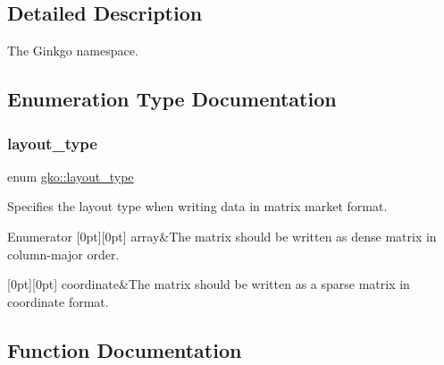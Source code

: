 \subsection{Detailed Description}
The Ginkgo namespace. 

\subsection{Enumeration Type Documentation}
\mbox{\label{namespacegko_ae749a5ea11a93c1bcc9158d9a6e9fb68}} 
\subsubsection{\texorpdfstring{layout\+\_\+type}{layout\_type}}
{\footnotesize\ttfamily enum \hyperlink{namespacegko_ae749a5ea11a93c1bcc9158d9a6e9fb68}{gko\+::layout\+\_\+type}\hspace{0.3cm}{\ttfamily [strong]}}



Specifies the layout type when writing data in matrix market format. 

\begin{DoxyEnumFields}{Enumerator}
[0pt][0pt]{}\mbox{\label{namespacegko_ae749a5ea11a93c1bcc9158d9a6e9fb68af1f713c9e000f5d3f280adbd124df4f5}} 
array&The matrix should be written as dense matrix in column-\/major order. \\
\hline

[0pt][0pt]{}\mbox{\label{namespacegko_ae749a5ea11a93c1bcc9158d9a6e9fb68af5d7aa3ba4929cc12dc51a92c59fabd3}} 
coordinate&The matrix should be written as a sparse matrix in coordinate format. \\
\hline

\end{DoxyEnumFields}


\subsection{Function Documentation}
\mbox{\label{namespacegko_a57797fc0a00fd4b7ff34ca4bfc84bc51}} 
